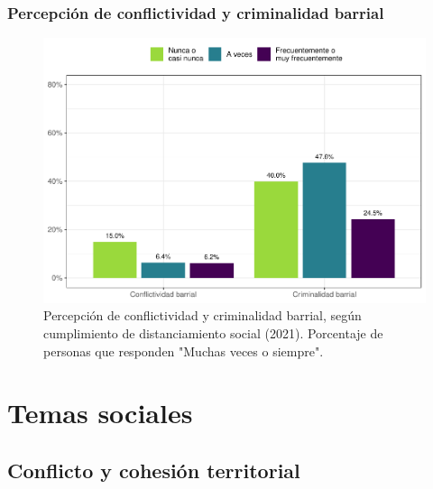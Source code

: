 \documentclass[
  12pt,
]{book}
\begin{document}
\hypertarget{percepciuxf3n-de-conflictividad-y-criminalidad-barrial}{%
\subsection{Percepción de conflictividad y criminalidad barrial}\label{percepciuxf3n-de-conflictividad-y-criminalidad-barrial}}

\begin{figure}

{\centering \includegraphics{reporte-elsoc_files/figure-latex/dist-barrio-1} 

}

\caption{Percepción de conflictividad y criminalidad barrial, según cumplimiento de distanciamiento social (2021). Porcentaje de personas que responden "Muchas veces o siempre".}\label{fig:dist-barrio}
\end{figure}

\hypertarget{temas-sociales}{%
\chapter{Temas sociales}\label{temas-sociales}}

\hypertarget{conflicto-y-cohesiuxf3n-territorial}{%
\section{Conflicto y cohesión territorial}\label{conflicto-y-cohesiuxf3n-territorial}}
\end{document}
